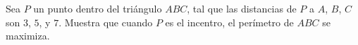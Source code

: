 Sea $P$ un punto dentro del triángulo $ABC$, tal que las distancias de $P$ a $A$, $B$, $C$ son $3$, $5$, y $7$. Muestra que cuando $P$ es el incentro, el perímetro de $ABC$ se maximiza.
